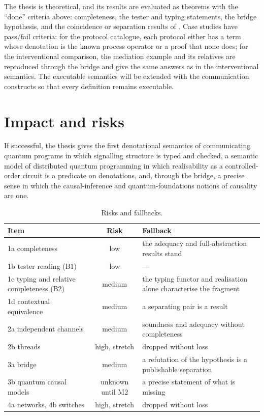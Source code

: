 The thesis is theoretical, and its results are evaluated as theorems with the ``done'' criteria above: completeness, the tester and typing statements, the bridge hypothesis, and the coincidence or separation results of . Case studies have pass/fail criteria: for the protocol catalogue, each protocol either has a term whose denotation is the known process operator or a proof that none does; for the interventional comparison, the mediation example and its relatives are reproduced through the bridge and give the same answers as in the interventional semantics. The executable semantics \cite{ARTIFACT_wang_2026_23207221} will be extended with the communication constructs so that every definition remains executable.

\section{Impact and risks}

If successful, the thesis gives the first denotational semantics of communicating quantum programs in which signalling structure is typed and checked, a semantic model of distributed quantum programming in which realisability as a controlled-order circuit is a predicate on denotations, and, through the bridge, a precise sense in which the causal-inference and quantum-foundations notions of causality are one.

\begin{table}[ht]
\centering\small
\begin{tabularx}{\textwidth}{lcX}
\toprule
Item & Risk & Fallback\\
\midrule
1a completeness & low & the adequacy and full-abstraction results stand\\
1b tester reading (B1) & low & ---\\
1c typing and relative completeness (B2) & medium & the typing functor and realisation alone characterise the fragment\\
1d contextual equivalence & medium & a separating pair is a result\\
2a independent channels & medium & soundness and adequacy without completeness\\
2b threads & high, stretch & dropped without loss\\
3a bridge & medium & a refutation of the hypothesis is a publishable separation\\
3b quantum causal models & unknown until M2 & a precise statement of what is missing\\
4a networks, 4b switches & high, stretch & dropped without loss\\
\bottomrule
\end{tabularx}
\caption{Risks and fallbacks.}
\end{table}

